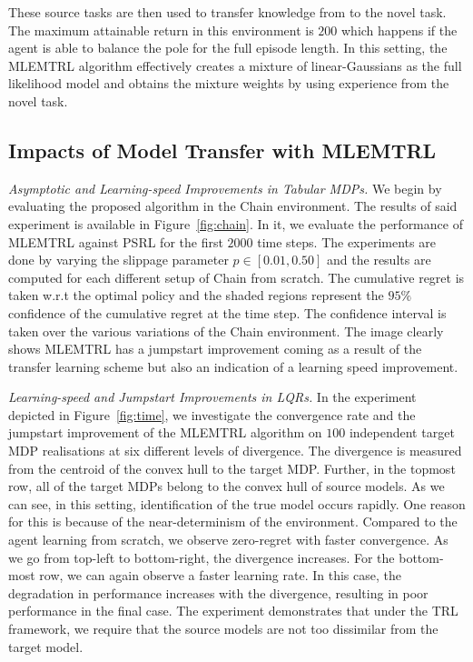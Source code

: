 These source tasks are then used to transfer knowledge from to the novel task. The maximum attainable return in this environment is $200$ which happens if the agent is able to balance the pole for the full episode length. In this setting, the MLEMTRL algorithm effectively creates a mixture of linear-Gaussians as the full likelihood model and obtains the mixture weights by using experience from the novel task.

\subsection{Impacts of Model Transfer with MLEMTRL}\label{sec:impacts}
\textit{Asymptotic and Learning-speed Improvements in Tabular MDPs.} We begin by evaluating the proposed algorithm in the Chain environment. The results of said experiment is available in Figure~\ref{fig:chain}. In it, we evaluate the performance of MLEMTRL against PSRL for the first $2000$ time steps. The experiments are done by varying the slippage parameter $p \in [0.01, 0.50]$ and the results are computed for each different setup of Chain from scratch. The cumulative regret is taken w.r.t the optimal policy and the shaded regions represent the $95\%$ confidence of the cumulative regret at the time step. The confidence interval is taken over the various variations of the Chain environment. The image clearly shows MLEMTRL has a jumpstart improvement coming as a result of the transfer learning scheme but also an indication of a learning speed improvement. 

\textit{Learning-speed and Jumpstart Improvements in LQRs.} In the experiment depicted in Figure~\ref{fig:time}, we investigate the convergence rate and the jumpstart improvement of the MLEMTRL algorithm on $100$ independent target MDP realisations at six different levels of divergence. The divergence is measured from the centroid of the convex hull to the target MDP. Further, in the topmost row, all of the target MDPs belong to the convex hull of source models. As we can see, in this setting, identification of the true model occurs rapidly. One reason for this is because of the near-determinism of the environment. Compared to the agent learning from scratch, we observe zero-regret with faster convergence. As we go from top-left to bottom-right, the divergence increases. For the bottom-most row, we can again observe a faster learning rate. In this case, the degradation in performance increases with the divergence, resulting in poor performance in the final case. The experiment demonstrates that under the TRL framework, we require that the source models are not too dissimilar from the target model.


